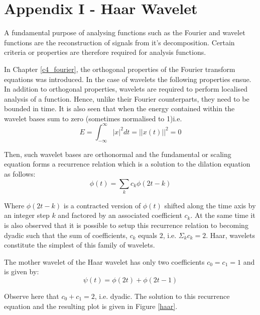 \section*{Appendix I - Haar Wavelet}

A fundamental purpose of analysing functions such as the Fourier and wavelet functions are the reconstruction of signals from it’s decomposition.  Certain criteria or properties are therefore required for analysis functions.  

In Chapter \ref{c4_fourier}, the orthogonal properties of the Fourier transform equations was introduced.  In the case of wavelets the following properties ensue.  In addition to orthogonal properties, wavelets are required to perform localised analysis of a function. Hence, unlike their Fourier counterparts, they need to be bounded in time.  It is also seen that when the energy contained within the wavelet bases sum to zero (sometimes normalised to 1)i.e.
\begin{equation}
    E=\int_{-\infty}^\infty |x|^2dt=||x(t)||^2=0
    \label{app1_01_pwr}
\end{equation}

Then, such wavelet bases are orthonormal and the fundamental or scaling equation forms a recurrence relation which is a solution to the dilation equation as follows:
\begin{equation}
    \phi(t)=\sum_kc_k\phi(2t-k)
    \label{app1_02_dilation}
\end{equation}

Where $\phi(2t-k)$ is a contracted version of $\phi(t)$ shifted along the time axis by an integer step $k$ and factored by an associated coefficient $c_k$.  At the same time it is also observed that it is possible to setup this recurrence relation to becoming dyadic such that the sum of coefficients, $c_k$ equals $2$, i.e. $\Sigma_kc_k=2$. Haar, wavelets constitute the simplest of this family of wavelets.

The mother wavelet of the Haar wavelet has only two coefficients $c_0=c_1=1$ and is given by:
\begin{equation}
    \psi(t)=\phi(2t)+\phi(2t-1)
    \label{app1_03_mwavlet}
\end{equation}

Observe here that $c_0+c_1=2$, i.e. dyadic.  The solution to this recurrence equation and the resulting plot is given in Figure \ref{haar}. 

